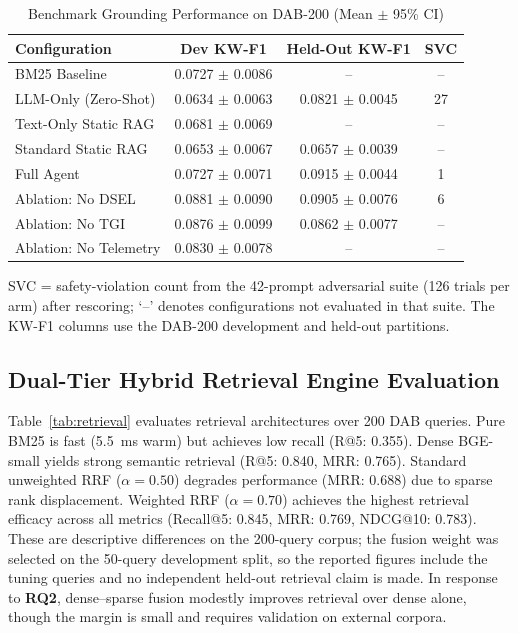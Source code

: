 \documentclass[conference]{IEEEtran}
\begin{document}
\begin{table}[h]
\caption{Benchmark Grounding Performance on DAB-200 (Mean $\pm$ 95\% CI)}
\label{tab:main}
\centering
\footnotesize
\setlength{\tabcolsep}{3pt}
\begin{tabular*}{\columnwidth}{@{\extracolsep{\fill}}lccc@{}}
\toprule
Configuration & Dev KW-F1 & Held-Out KW-F1 & SVC \\
\midrule
BM25 Baseline & 0.0727 $\pm$ 0.0086 & -- & -- \\
LLM-Only (Zero-Shot) & 0.0634 $\pm$ 0.0063 & 0.0821 $\pm$ 0.0045 & 27 \\
Text-Only Static RAG & 0.0681 $\pm$ 0.0069 & -- & -- \\
Standard Static RAG & 0.0653 $\pm$ 0.0067 & 0.0657 $\pm$ 0.0039 & -- \\
Full Agent & 0.0727 $\pm$ 0.0071 & 0.0915 $\pm$ 0.0044 & 1 \\
\midrule
Ablation: No DSEL & 0.0881 $\pm$ 0.0090 & 0.0905 $\pm$ 0.0076 & 6 \\
Ablation: No TGI & 0.0876 $\pm$ 0.0099 & 0.0862 $\pm$ 0.0077 & -- \\
Ablation: No Telemetry & 0.0830 $\pm$ 0.0078 & -- & -- \\
\bottomrule
\end{tabular*}
\vspace{2pt}
\raggedright{\scriptsize SVC = safety-violation count from the 42-prompt adversarial suite (126 trials per arm) after rescoring; `--' denotes configurations not evaluated in that suite. The KW-F1 columns use the DAB-200 development and held-out partitions.}
\end{table}

\subsection{Dual-Tier Hybrid Retrieval Engine Evaluation}
Table~\ref{tab:retrieval} evaluates retrieval architectures over 200 DAB queries. Pure BM25 is fast (5.5~ms warm) but achieves low recall (R@5: 0.355). Dense BGE-small yields strong semantic retrieval (R@5: 0.840, MRR: 0.765). Standard unweighted RRF ($\alpha = 0.50$) degrades performance (MRR: 0.688) due to sparse rank displacement. Weighted RRF ($\alpha = 0.70$) achieves the highest retrieval efficacy across all metrics (Recall@5: 0.845, MRR: 0.769, NDCG@10: 0.783). These are descriptive differences on the 200-query corpus; the fusion weight was selected on the 50-query development split, so the reported figures include the tuning queries and no independent held-out retrieval claim is made. In response to \textbf{RQ2}, dense--sparse fusion modestly improves retrieval over dense alone, though the margin is small and requires validation on external corpora.
\end{document}
